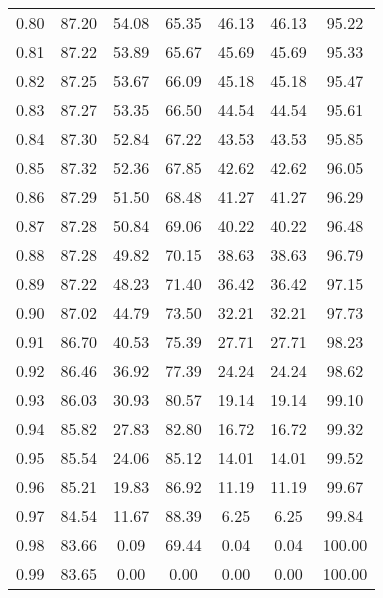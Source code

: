 \begin{tabular}{|c|c|c|c|c|c|c|}
      0.80 &     87.20 &     54.08 &      65.35 &   46.13 &      46.13 &         95.22 \\
      0.81 &     87.22 &     53.89 &      65.67 &   45.69 &      45.69 &         95.33 \\
      0.82 &     87.25 &     53.67 &      66.09 &   45.18 &      45.18 &         95.47 \\
      0.83 &     87.27 &     53.35 &      66.50 &   44.54 &      44.54 &         95.61 \\
      0.84 &     87.30 &     52.84 &      67.22 &   43.53 &      43.53 &         95.85 \\
      0.85 &     87.32 &     52.36 &      67.85 &   42.62 &      42.62 &         96.05 \\
      0.86 &     87.29 &     51.50 &      68.48 &   41.27 &      41.27 &         96.29 \\
      0.87 &     87.28 &     50.84 &      69.06 &   40.22 &      40.22 &         96.48 \\
      0.88 &     87.28 &     49.82 &      70.15 &   38.63 &      38.63 &         96.79 \\
      0.89 &     87.22 &     48.23 &      71.40 &   36.42 &      36.42 &         97.15 \\
      0.90 &     87.02 &     44.79 &      73.50 &   32.21 &      32.21 &         97.73 \\
      0.91 &     86.70 &     40.53 &      75.39 &   27.71 &      27.71 &         98.23 \\
      0.92 &     86.46 &     36.92 &      77.39 &   24.24 &      24.24 &         98.62 \\
      0.93 &     86.03 &     30.93 &      80.57 &   19.14 &      19.14 &         99.10 \\
      0.94 &     85.82 &     27.83 &      82.80 &   16.72 &      16.72 &         99.32 \\
      0.95 &     85.54 &     24.06 &      85.12 &   14.01 &      14.01 &         99.52 \\
      0.96 &     85.21 &     19.83 &      86.92 &   11.19 &      11.19 &         99.67 \\
      0.97 &     84.54 &     11.67 &      88.39 &    6.25 &       6.25 &         99.84 \\
      0.98 &     83.66 &      0.09 &      69.44 &    0.04 &       0.04 &        100.00 \\
      0.99 &     83.65 &      0.00 &       0.00 &    0.00 &       0.00 &        100.00 \\
\bottomrule
\end{tabular}

